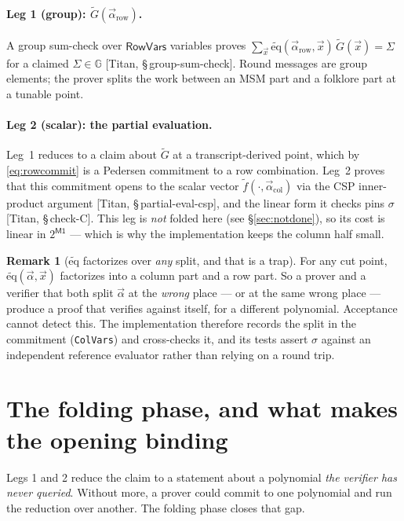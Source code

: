\documentclass[11pt,a4paper]{article}
\newcommand{\G}{\mathbb{G}}
\newcommand{\eq}{\widetilde{\mathrm{eq}}}
\newcommand{\paper}[1]{\textsf{[Titan, #1]}}
\theoremstyle{definition}
\newtheorem{remark}{Remark}
\begin{document}
\paragraph{Leg 1 (group): $\widetilde G(\vec\alpha_{\mathrm{row}})$.}
A group sum-check over $\mathsf{RowVars}$ variables proves
$\sum_{\vec x} \eq(\vec\alpha_{\mathrm{row}}, \vec x)\, \widetilde G(\vec x) = \Sigma$
for a claimed $\Sigma \in \G$ \paper{\S\,group-sum-check}. Round messages are group
elements; the prover splits the work between an MSM part and a folklore part at a
tunable point.

\paragraph{Leg 2 (scalar): the partial evaluation.}
Leg~1 reduces to a claim about $\widetilde G$ at a transcript-derived point, which by
\eqref{eq:rowcommit} is a Pedersen commitment to a row combination. Leg~2 proves that
this commitment opens to the scalar vector
$\widetilde f(\cdot, \vec\alpha_{\mathrm{col}})$ via the CSP inner-product argument
\paper{\S\,partial-eval-csp}, and the linear form it checks pins $\sigma$
\paper{\S\,check-C}. This leg is \emph{not} folded here (see
\S\ref{sec:notdone}), so its cost is linear in $2^{\mathsf{M1}}$ --- which is why the
implementation keeps the column half small.

\begin{remark}[$\eq$ factorizes over \emph{any} split, and that is a trap]
\label{rem:eqtrap}
For any cut point, $\eq(\vec\alpha,\vec x)$ factorizes into a column part and a row
part. So a prover and a verifier that both split $\vec\alpha$ at the \emph{wrong} place
--- or at the same wrong place --- produce a proof that verifies against itself, for a
different polynomial. Acceptance cannot detect this. The implementation therefore
records the split in the commitment (\texttt{ColVars}) and cross-checks it, and its
tests assert $\sigma$ against an independent reference evaluator rather than relying on
a round trip.
\end{remark}

\section{The folding phase, and what makes the opening binding}
\label{sec:fold}

Legs 1 and 2 reduce the claim to a statement about a polynomial \emph{the verifier has
never queried}. Without more, a prover could commit to one polynomial and run the
reduction over another. The folding phase closes that gap.
\end{document}
